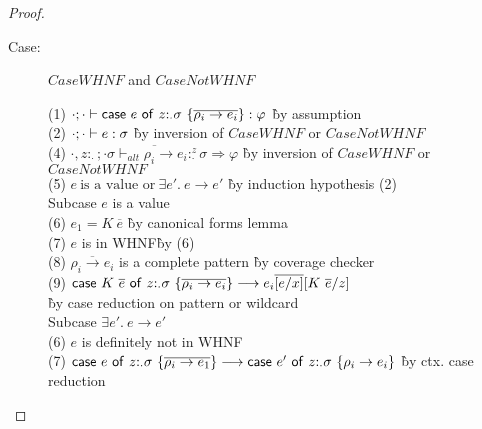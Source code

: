 \begin{proof}
\begin{description}
\item[Case:] $CaseWHNF$ and $CaseNotWHNF$
\begin{tabbing}
    (1) $\cdot; \cdot \vdash \mathsf{case}~e~\mathsf{of}~z{:}_{\cdot}\sigma~\{\overline{\rho_i \to e_i}\} : \varphi$ \` by assumption \\
    (2) $\cdot; \cdot \vdash e : \sigma$ \` by inversion of $CaseWHNF$ or $CaseNotWHNF$\\
    (4) $\overline{\cdot, z{:}_{\cdot}; \cdot \sigma \vdash_{alt} \rho_i\to e_i :^z_\cdot \sigma \Rightarrow \varphi}$ \` by inversion of $CaseWHNF$ or $CaseNotWHNF$\\
    (5) $e~\textrm{is a value or}~\exists e'.~e \longrightarrow e'$ \` by induction hypothesis (2) \\
    Subcase $e$ is a value\\
    (6) $e_1 = K~\overline{e}$ \` by canonical forms lemma \\
    (7) $e$ is in WHNF\` by (6)\\ %
    (8) $\overline{\rho_i \to e_i}$ is a complete pattern \` by coverage checker\\
    (9) $\mathsf{case}~K~\overline{e}~\mathsf{of}~z{:}_{\cdot}\sigma~\{\overline{\rho_i \to e_i}\} \longrightarrow e_i\overline{[e/x]}[K~\overline{e}/z]$\\\` by case reduction on pattern or wildcard\\
    Subcase $\exists e'.~e \longrightarrow e'$\\
    (6) $e$ is definitely not in WHNF\\
    (7) $\mathsf{case}~e~\mathsf{of}~z{:}_{\cdot}\sigma~\{\overline{\rho_i \to e_1}\} \longrightarrow \mathsf{case}~e'~\mathsf{of}~z{:}_{\cdot}\sigma~\{\rho_i \to e_i\}$ \` by ctx. case reduction\\
\end{tabbing}

\end{description}

\end{proof}

